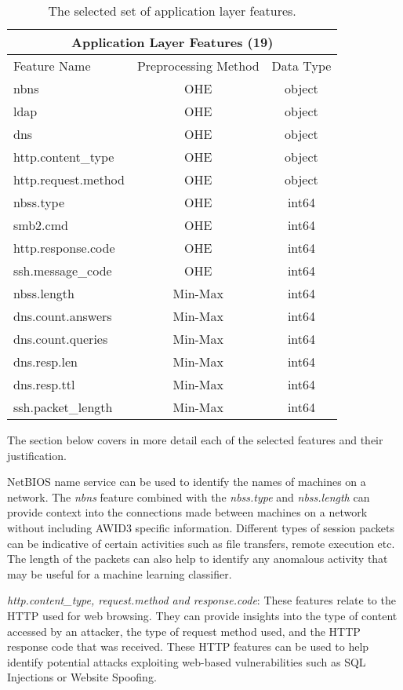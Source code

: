 \begin{table}[H]
\begin{tabular}{lcc}
\hline
\multicolumn{3}{c}{\textbf{Application Layer Features (19)}} \\ \hline
Feature Name & Preprocessing Method & Data Type \\ \hline
nbns & OHE & object \\
ldap & OHE & object \\
dns & OHE & object \\
http.content\_type & OHE & object \\
http.request.method & OHE & object \\
nbss.type & OHE & int64 \\
smb2.cmd & OHE & int64 \\
http.response.code & OHE & int64 \\
ssh.message\_code & OHE & int64 \\
nbss.length & Min-Max & int64 \\
dns.count.answers & Min-Max & int64 \\
dns.count.queries & Min-Max & int64 \\
dns.resp.len & Min-Max & int64 \\
dns.resp.ttl & Min-Max & int64 \\
ssh.packet\_length & Min-Max & int64 \\ \hline
\end{tabular}
\caption{The selected set of application layer features.}
\label{tab:application_features}
\end{table}

The section below covers in more detail each of the selected features and their justification.

NetBIOS name service can be used to identify the names of machines on a network. The \textit{nbns} feature combined with the \textit{nbss.type} and \textit{nbss.length} can provide context into the connections made between machines on a network without including AWID3 specific information. Different types of session packets can be indicative of certain activities such as file transfers, remote execution etc. The length of the packets can also help to identify any anomalous activity that may be useful for a machine learning classifier. 

\medskip
\textit{http.content\_type, request.method and response.code}: These features relate to the HTTP used for web browsing. They can provide insights into the type of content accessed by an attacker, the type of request method used, and the HTTP response code that was received. These HTTP features can be used to help identify potential attacks exploiting web-based vulnerabilities such as SQL Injections or Website Spoofing.

